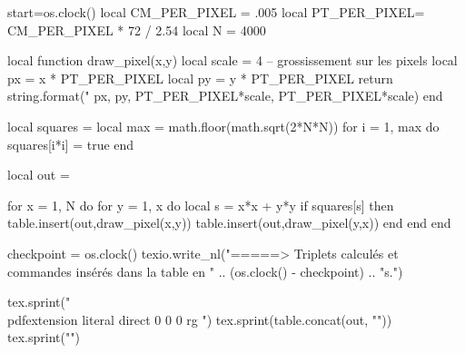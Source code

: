 \documentclass{article}
\begin{document}
\pagestyle{empty}
\leavevmode
\begin{luacode*}
start=os.clock()
local CM_PER_PIXEL  = .005
local PT_PER_PIXEL= CM_PER_PIXEL * 72 / 2.54
local N = 4000

local function draw_pixel(x,y)
	local scale = 4 -- grossissement sur les pixels
    local px = x * PT_PER_PIXEL
    local py = y * PT_PER_PIXEL
    return string.format("%
          px, py, PT_PER_PIXEL*scale, PT_PER_PIXEL*scale)
end


local squares = {}
local max = math.floor(math.sqrt(2*N*N))
for i = 1, max do
  squares[i*i] = true
end

local out = {}

for x = 1, N do
  for y = 1, x do
    local s = x*x + y*y
    if squares[s] then
      table.insert(out,draw_pixel(x,y))
      table.insert(out,draw_pixel(y,x))
    end
  end
end

checkpoint = os.clock()
texio.write_nl("\n=====> Triplets calculés et commandes insérés dans la table  en " .. (os.clock() - checkpoint) .. "s.")


tex.sprint("\\pdfextension literal direct {0 0 0 rg ")
tex.sprint(table.concat(out, "\n"))
tex.sprint("}")
\end{luacode*}


\end{document}
